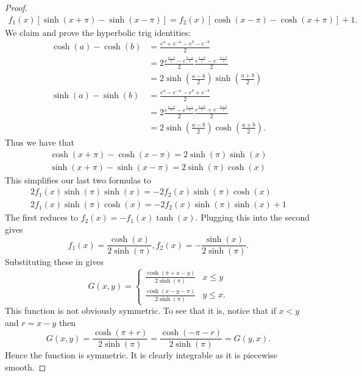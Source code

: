 \documentclass{amsart}
\theoremstyle{plain}
\theoremstyle{definition}
\begin{document}
\begin{proof}
\begin{gather*}
    f_1(x)\left[\sinh(x+\pi)-\sinh(x-\pi)\right] = f_2(x)\left[\cosh(x-\pi)-\cosh(x+\pi)\right]+1.
\end{gather*}
We claim and prove the hyperbolic trig identities:
\begin{align*}
    \cosh(a)-\cosh(b) &= \frac{e^{a}+e^{-a}-e^{b}-e^{-b}}{2}\\
    &= 2 \frac{e^{\frac{a-b}{2}}-e^{\frac{b-a}{2}}}{2}\frac{e^{\frac{a+b}{2}}-e^{-\frac{a+b}{2}}}{2}\\
    &= 2\sinh\left(\frac{a-b}{2}\right) \sinh\left(\frac{a+b}{2}\right)\\
    \sinh(a)-\sinh(b) &=  \frac{e^{a}-e^{-a}-e^{b}+e^{-b}}{2}\\
    &= 2 \frac{e^{\frac{a-b}{2}}-e^{\frac{b-a}{2}}}{2}\frac{e^{\frac{a+b}{2}}+e^{-\frac{a+b}{2}}}{2}\\
    &= 2\sinh\left(\frac{a-b}{2}\right)\cosh\left(\frac{a+b}{2}\right).
\end{align*}
Thus we have that 
\begin{gather*}
    \cosh(x+\pi)-\cosh(x-\pi) = 2\sinh\left(\pi\right)\sinh\left(x\right)\\
    \sinh(x+\pi) - \sinh(x-\pi) = 2\sinh(\pi)\cosh(x)
\end{gather*}
This simplifies our last two formulas to
\begin{gather*}
2f_1(x)\sinh\left(\pi\right)\sinh\left(x\right) = -2f_2(x)\sinh\left(\pi\right)\cosh\left(x\right) \\2f_1(x)\sinh\left(\pi\right)\cosh\left(x\right) = -2f_2(x)\sinh\left(\pi\right)\sinh\left(x\right) +1
\end{gather*}
The first reduces to $f_2(x) = -f_1(x)\tanh(x). $ Plugging this into the second gives 
 $$f_1(x) = \frac{\cosh(x)}{2\sinh(\pi)}, f_2(x) = -\frac{\sinh(x)}{2\sinh(\pi)}.$$
Substituting these in gives
$$
G(x,y) = \begin{cases}
    \frac{\cosh\left(\pi+x-y\right)}{2\sinh(\pi)}& x\leq y\\
    \frac{\cosh\left(x-y-\pi\right)}{2\sinh(\pi)}& y\leq x.
\end{cases}
$$
This function is not obviously symmetric. To see that it is, notice that if $x<y$ and $r = x-y$ then
$$G(x,y) = \frac{\cosh\left(\pi+r\right)}{2\sinh(\pi)} = \frac{\cosh\left(-\pi-r\right)}{2\sinh(\pi)} = G(y,x).$$
Hence the function is symmetric. It is clearly integrable as it is piecewise smooth. 
\end{proof}
\end{document}
